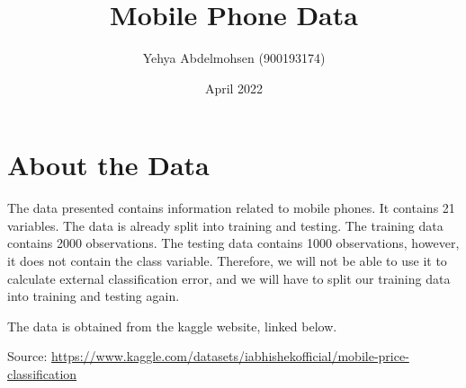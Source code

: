 \documentclass{article}
\title{Mobile Phone Data}
\author{Yehya Abdelmohsen (900193174)}
\date{April 2022}
\begin{document}
\maketitle

\section{About the Data}
The data presented contains information related to mobile phones. It contains 21 variables. The data is already split into training and testing. The training data contains 2000 observations. The testing data contains 1000 observations, however, it does not contain the class variable. Therefore, we will not be able to use it to calculate external classification error, and we will have to split our training data into training and testing again.
\newline
\par
\noindent
The data is obtained from the kaggle website, linked below.
\newline
\par
\noindent
Source: \url{https://www.kaggle.com/datasets/iabhishekofficial/mobile-price-classification}
\end{document}
